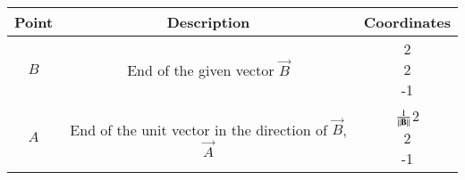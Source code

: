 \begin{center}
    \begin{tabular}{|c|c|c|} 
        \hline
            \textbf{Point} & \textbf{Description} & \textbf{Coordinates} \\ 
        \hline
	    $B$   & End of the given vector $\vec{B}$ & \myvec{2 \\ 2 \\ -1} \\ 
        \hline
	    $A$   & End of the unit vector in the direction of $\vec{B}$, $\vec{A}$ & $\frac{1}{\left\lVert\mathbf{B}\right\rVert}$\myvec{2 \\ 2 \\ -1}\\ 
        \hline
    \end{tabular}
\end{center}  
